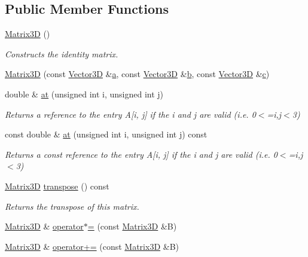 \subsection*{Public Member Functions}
\begin{DoxyCompactItemize}
\item 
\hyperlink{classlinalg_1_1Matrix3D_a868d0ba8d6ad2fcccc39c1633a5a854a}{Matrix3D} ()
\begin{DoxyCompactList}\small\item\em Constructs the identity matrix. \end{DoxyCompactList}\item 
\hyperlink{classlinalg_1_1Matrix3D_a3a7ce553d163d01e112c55a1afa712ca}{Matrix3D} (const \hyperlink{classVector3D}{Vector3D} \&\hyperlink{classlinalg_1_1Matrix3D_a33667283fe3c4bbac6d4f78eae2af3b6}{a}, const \hyperlink{classVector3D}{Vector3D} \&\hyperlink{classlinalg_1_1Matrix3D_acf0cd214420329fe18c902be95da0b23}{b}, const \hyperlink{classVector3D}{Vector3D} \&\hyperlink{classlinalg_1_1Matrix3D_abe82e945bf73f0d0f6f28c1749e2c7e3}{c})
\item 
double \& \hyperlink{classlinalg_1_1Matrix3D_a1021460c27da3f21690b68a2c7dea870}{at} (unsigned int i, unsigned int j)
\begin{DoxyCompactList}\small\item\em Returns a reference to the entry A\mbox{[}i, j\mbox{]} if the i and j are valid (i.\+e. 0$<$=i,j$<$3) \end{DoxyCompactList}\item 
const double \& \hyperlink{classlinalg_1_1Matrix3D_a2c5bee46e64a05d4671a8c72bc4f7e03}{at} (unsigned int i, unsigned int j) const 
\begin{DoxyCompactList}\small\item\em Returns a const reference to the entry A\mbox{[}i, j\mbox{]} if the i and j are valid (i.\+e. 0$<$=i,j$<$3) \end{DoxyCompactList}\item 
\hyperlink{classlinalg_1_1Matrix3D}{Matrix3D} \hyperlink{classlinalg_1_1Matrix3D_a45c2dfdae0a9a857e43429ac0fefa206}{transpose} () const 
\begin{DoxyCompactList}\small\item\em Returns the transpose of this matrix. \end{DoxyCompactList}\item 
\hyperlink{classlinalg_1_1Matrix3D}{Matrix3D} \& \hyperlink{classlinalg_1_1Matrix3D_aff9083d3f737113ea70ca544bee86d8f}{operator$\ast$=} (const \hyperlink{classlinalg_1_1Matrix3D}{Matrix3D} \&B)
\item 
\hyperlink{classlinalg_1_1Matrix3D}{Matrix3D} \& \hyperlink{classlinalg_1_1Matrix3D_ae9c4b93227bc3cb85796ae377a476d2b}{operator+=} (const \hyperlink{classlinalg_1_1Matrix3D}{Matrix3D} \&B)
\end{DoxyCompactItemize}
